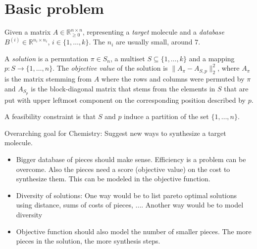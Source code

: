 \documentclass[11pt,a4paper]{article}
\begin{document}
\section{Basic problem}
\label{sec:1}

Given a matrix $A \in \mathbb{R}_{{\geq 0}}^{n \times n}$, representing a \emph{target} molecule and a \emph{database} $B^{(i)} \in \mathbb{R}^{n_i \times n_i}$, $i \in \{1,\dots,k\}$. The $n_i$ are usually small, around $7$. 


A \emph{solution} is a permutation $\pi \in S_n$, a  multiset  $S \subseteq \{1,\dots,k\}$ and a mapping $p: S \to \{1,\dots,n\}$. The \emph{objective value} of the  solution is $\| A_\pi - A_{S,p}\|_2^2$, where $A_\pi$ is the matrix stemming from $A$ where the rows and columns were permuted by $\pi$ and $A_{S_p}$ is the block-diagonal matrix that stems from the elements in $S$ that are put with upper leftmost component on the corresponding position described by $p$.

A feasibility constraint is that $S$ and $p$ induce a partition  of the set $\{1,\dots,n\}$.



Overarching goal for Chemistry: Suggest new ways to synthesize a target molecule.



\begin{itemize}
\item Bigger database of pieces should make sense. Efficiency is a
  problem can be overcome.  Also the pieces need a score (objective
  value) on the cost to synthesize them. This can be modeled in the objective function. 
\item Diversity of solutions: One way would be to list pareto optimal
  solutions using distance, sums of costs of pieces, .... Another way
  would be to model diversity
\item Objective function should also model the number of smaller pieces. The more pieces in the solution, the more synthesis steps.
 
\end{itemize}
\end{document}
